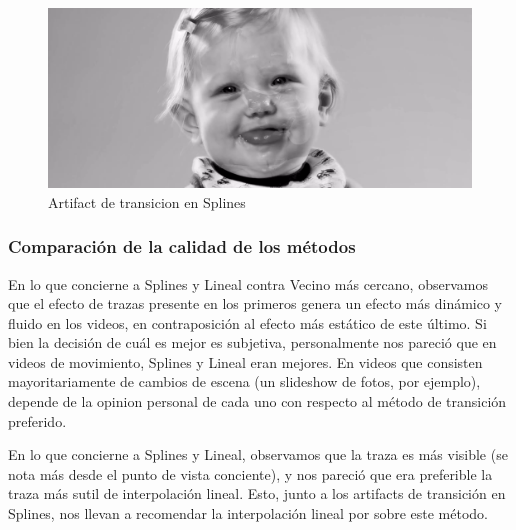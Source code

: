 \FloatBarrier
\begin{figure}[h]
\caption{Artifact de transicion en Splines}
\label{BebesSplinesArtifact}
\includegraphics[width=0.9\columnwidth]{imagenes/cualitativos/BSA.png}
\end{figure}
\FloatBarrier

\subsubsection{Comparaci\'on de la calidad de los m\'etodos}
\par En lo que concierne a Splines y Lineal contra Vecino m\'as cercano, observamos que el efecto de trazas presente en los primeros genera un efecto m\'as din\'amico y fluido en los videos, en contraposici\'on al efecto m\'as est\'atico de este \'ultimo.
Si bien la decisi\'on de cu\'al es mejor es subjetiva, personalmente nos pareci\'o que en videos de movimiento, Splines y Lineal eran mejores.
En videos que consisten mayoritariamente de cambios de escena (un slideshow de fotos, por ejemplo), depende de la opinion personal de cada uno con respecto al m\'etodo de transici\'on preferido.
\par En lo que concierne a Splines y Lineal, observamos que la traza es m\'as visible (se nota m\'as desde el punto de vista conciente), y nos pareci\'o que era preferible la traza m\'as sutil de interpolaci\'on lineal.
Esto, junto a los artifacts de transici\'on en Splines, nos llevan a recomendar la interpolaci\'on lineal por sobre este m\'etodo.
